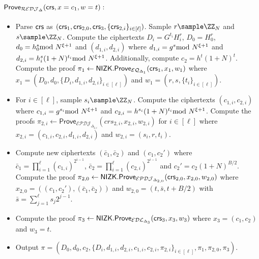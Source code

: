 \begin{construction}
 \paragraph{$\mathsf{Prove}_{\mathcal{REDJ}_{\Delta}}(\mathsf{crs},x=c_1,w=t):$}
 \begin{itemize}
\item Parse $\mathsf{crs}$ as $(\mathsf{crs}_1,\mathsf{crs}_{2,0},\mathsf{crs}_3,\{\mathsf{crs}_{2,i}\}_{i\in [\ell]})$.
Sample $r\sample \ZZ_N$ and $s\sample \ZZ_N$. Compute the ciphertexts $D_i=G^{t_i}H_i^r$, $D_0=H_0^r$, $d_0=h_0^s\!\!\!\!\mod N^{\xi+1}$ and $(d_{1,i},d_{2,i})$ where $d_{1,i}=g^{s}\!\!\!\!\mod N^{\xi+1}$ and $d_{2,i}=h_i^{s}(1+N)^{t_i}\!\!\!\!\mod N^{\xi+1}$. Additionally, compute $c_2=h^t(1+N)^t$. Compute the proof $\pi_1\leftarrow\mathsf{NIZK.Prove}_{\mathcal{EQ}_{\Delta_1}}(\mathsf{crs}_1,x_1,w_1)$ where $x_1=(D_0,d_0,\{D_i,d_{1,i},d_{2,i}\}_{i\in [\ell]})$ and $w_1=(r,s,\{t_i\}_{i\in[\ell]})$.

\item For $i\in[\ell]$,  sample $s_i\sample \ZZ_N$. Compute the ciphertexts $(c_{1,i},c_{2,i})$ where $c_{1,i}=g^{s_i}\!\!\!\!\mod N^{\xi+1}$ and $c_{2,i}=h^{s_i}(1+N)^{t_i}\!\!\!\!\mod N^{\xi+1}$. Compute the proofs $\pi_{2,i}\leftarrow \mathsf{Prove}_{\mathcal{EPDJ}_{\Delta_{2,i}}}(crs_{2,i},x_{2,i},w_{2,i})$ for $i\in [\ell]$ where $x_{2,i}=(c_{1,i},c_{2,i},d_{1,i},d_{2,i})$ and $w_{2,i}=(s_i,r,t_i)$.

\item Compute new ciphertexts $(\bar c_1,\bar c_2)$ and $(c_1,c_2')$ where $\bar c_1=\prod_{i=1}^\ell (c_{1,i})^{2^{i-1}}$, $\bar c_2=\prod_{i=1}^\ell (c_{2,i})^{2^{i-1}}$ and $c_2'=c_2(1+N)^{B/2}$. 
Compute the proof $\pi_{2,0}\leftarrow\mathsf{NIZK.Prove}_{\mathcal{EPDJ}_{\Delta_{2,0}}}(\mathsf{crs}_{2,0},x_{2,0},w_{2,0})$ where $x_{2,0}=((c_1,c_2'),(\bar c_1,\bar c_2))$ and $w_{2,0}=(t,\bar s, t+B/2)$ with $\bar s=\sum_{j=1}^{\ell} s_j2^{j-1}$.
\item Compute the proof $\pi_3\leftarrow\mathsf{NIZK.Prove}_{\mathcal{EDL}_{\Delta_3}}(\mathsf{crs}_3,x_3,w_3)$ where $x_3=(c_1,c_2)$ and $w_3=t$.
\item Output $\pi=(D_0,d_0,c_2,\{D_i,d_{1,i},d_{2,i},c_{1,i},c_{2,i},\pi_{2,i}\}_{i\in [\ell]},\pi_1,\pi_{2,0},\pi_3)$.
 \end{itemize}


\end{construction}
